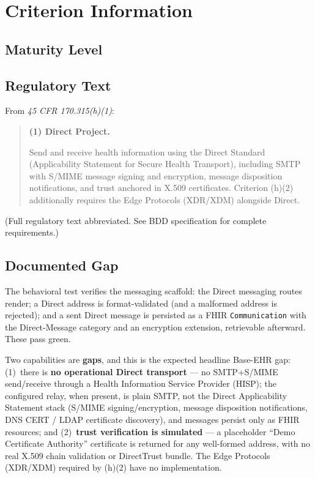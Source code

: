 \section{Criterion Information}

\subsection{Maturity Level}

\subsection{Regulatory Text}

From \textit{45 CFR \textsection{} 170.315(h)(1)}:

\begin{quotation}
\textbf{(1) Direct Project.}

Send and receive health information using the Direct Standard (Applicability Statement for Secure Health Transport), including SMTP with S/MIME message signing and encryption, message disposition notifications, and trust anchored in X.509 certificates. Criterion (h)(2) additionally requires the Edge Protocols (XDR/XDM) alongside Direct.
\end{quotation}

(Full regulatory text abbreviated. See BDD specification for complete requirements.)

\subsection{Documented Gap}

The behavioral test verifies the messaging scaffold: the Direct messaging routes render; a Direct address is format-validated (and a malformed address is rejected); and a sent Direct message is persisted as a FHIR \texttt{Communication} with the Direct-Message category and an encryption extension, retrievable afterward. These pass green.

Two capabilities are \textbf{gaps}, and this is the expected headline Base-EHR gap: (1)~there is \textbf{no operational Direct transport} --- no SMTP+S/MIME send/receive through a Health Information Service Provider (HISP); the configured relay, when present, is plain SMTP, not the Direct Applicability Statement stack (S/MIME signing/encryption, message disposition notifications, DNS CERT / LDAP certificate discovery), and messages persist only as FHIR resources; and (2)~\textbf{trust verification is simulated} --- a placeholder ``Demo Certificate Authority'' certificate is returned for any well-formed address, with no real X.509 chain validation or DirectTrust bundle. The Edge Protocols (XDR/XDM) required by (h)(2) have no implementation.

